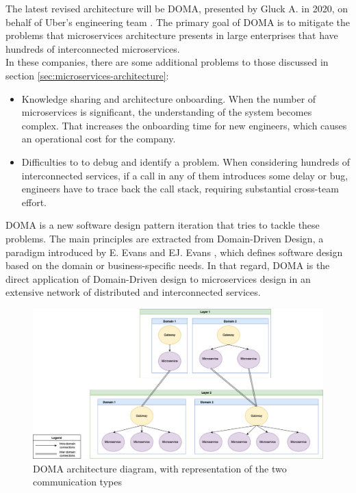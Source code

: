 \documentclass[english, 12pt, a4paper, sci, utf8, a-1b, online]{aaltothesis}
\begin{document}

The latest revised architecture will be DOMA, presented by Gluck A. in 2020, on behalf of Uber's engineering team \cite{DOMAUber}. The primary goal of DOMA is to mitigate the problems that microservices architecture presents in large enterprises that have hundreds of interconnected microservices.\\

In these companies, there are some additional problems to those discussed in section \ref{sec:microservices-architecture}:

\begin{itemize}
    \item Knowledge sharing and architecture onboarding. When the number of microservices is significant, the understanding of the system becomes complex. That increases the onboarding time for new engineers, which causes an operational cost for the company.
    \item Difficulties to to debug and identify a problem. When considering hundreds of interconnected services, if a call in any of them introduces some delay or bug, engineers have to trace back the call stack, requiring substantial cross-team effort.
\end{itemize}

DOMA is a new software design pattern iteration that tries to tackle these problems. The main principles are extracted from Domain-Driven Design, a paradigm introduced by E. Evans and EJ. Evans \cite{evans2004domain}, which defines software design based on the domain or business-specific needs. In that regard, DOMA is the direct application of Domain-Driven design to microservices design in an extensive network of distributed and interconnected services.\\

\begin{figure}[h!]
    \centering
    \includegraphics[scale=0.3]{src/thesis/img/literature-review/doma.png}
    \caption{DOMA architecture diagram, with representation of the two communication types}
    \label{fig:my_label}
\end{figure}
\end{document}
